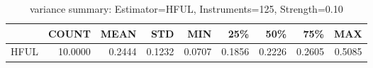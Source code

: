 \begin{table}[ht]
\centering
\caption{variance summary: Estimator=HFUL, Instruments=125, Strength=0.10}
\begin{tabular}{lrrrrrrrr}
\toprule
 & COUNT & MEAN & STD & MIN & 25\% & 50\% & 75\% & MAX \\
\midrule
HFUL & 10.0000 & 0.2444 & 0.1232 & 0.0707 & 0.1856 & 0.2226 & 0.2605 & 0.5085 \\
\bottomrule
\end{tabular}
\end{table}
